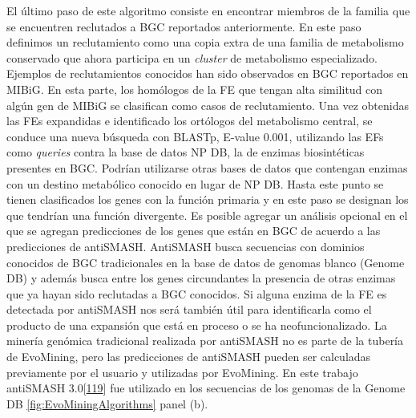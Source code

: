 \documentclass[12pt,twoside]{reedthesis}
\begin{document}
  El último paso de este algoritmo consiste en encontrar miembros de la
  familia que se encuentren reclutados a BGC reportados anteriormente. En
  este paso definimos un reclutamiento como una copia extra de una familia
  de metabolismo conservado que ahora participa en un \emph{cluster} de
  metabolismo especializado. Ejemplos de reclutamientos conocidos han sido
  observados en BGC reportados en MIBiG. En esta parte, los homólogos de
  la FE que tengan alta similitud con algún gen de MIBiG se clasifican
  como casos de reclutamiento. Una vez obtenidas las FEs expandidas e
  identificado los ortólogos del metabolismo central, se conduce una nueva
  búsqueda con BLASTp, E-value 0.001, utilizando las EFs como
  \emph{queries} contra la base de datos NP DB, la de enzimas
  biosintéticas presentes en BGC. Podrían utilizarse otras bases de datos
  que contengan enzimas con un destino metabólico conocido en lugar de NP
  DB. Hasta este punto se tienen clasificados los genes con la función
  primaria y en este paso se designan los que tendrían una función
  divergente. Es posible agregar un análisis opcional en el que se agregan
  predicciones de los genes que están en BGC de acuerdo a las predicciones
  de antiSMASH. AntiSMASH busca secuencias con dominios conocidos de BGC
  tradicionales en la base de datos de genomas blanco (Genome DB) y además
  busca entre los genes circundantes la presencia de otras enzimas que ya
  hayan sido reclutadas a BGC conocidos. Si alguna enzima de la FE es
  detectada por antiSMASH nos será también útil para identificarla como el
  producto de una expansión que está en proceso o se ha neofuncionalizado.
  La minería genómica tradicional realizada por antiSMASH no es parte de
  la tubería de EvoMining, pero las predicciones de antiSMASH pueden ser
  calculadas previamente por el usuario y utilizadas por EvoMining. En
  este trabajo antiSMASH
  3.0{[}\protect\hyperlink{ref-weber_antismash3_2015}{119}{]} fue
  utilizado en los secuencias de los genomas de la Genome DB
  \autoref{fig:EvoMiningAlgorithms} panel (b).
  
\end{document}
